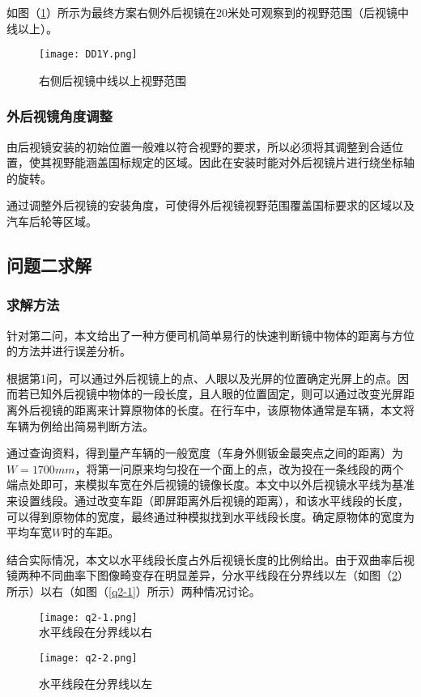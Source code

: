 \documentclass[bwprint]{cumcmthesis}
\begin{document}
\par 如图（\ref{fig:DD1Y}）所示为最终方案右侧外后视镜在20米处可观察到的视野范围（后视镜中线以上）。

\begin{figure}[!htbp]
\small
\centering
\texttt{[image: DD1Y.png]}
\caption{右侧后视镜中线以上视野范围} \label{fig:DD1Y}
\end{figure}

 
\subsubsection{外后视镜角度调整}
\par 由后视镜安装的初始位置一般难以符合视野的要求，所以必须将其调整到合适位置，使其视野能涵盖国标规定的区域。因此在安装时能对外后视镜片进行绕坐标轴的旋转。

\par 通过调整外后视镜的安装角度，可使得外后视镜视野范围覆盖国标要求的区域以及汽车后轮等区域。
 
\subsection{问题二求解}
\subsubsection{求解方法}
\par 针对第二问，本文给出了一种方便司机简单易行的快速判断镜中物体的距离与方位的方法并进行误差分析。
\par 根据第1问，可以通过外后视镜上的点、人眼以及光屏的位置确定光屏上的点。因而若已知外后视镜中物体的一段长度，且人眼的位置固定，则可以通过改变光屏距离外后视镜的距离来计算原物体的长度。在行车中，该原物体通常是车辆，本文将车辆为例给出简易判断方法。
\par 通过查询资料，得到量产车辆的一般宽度（车身外侧钣金最突点之间的距离）为$W=1700mm$，将第一问原来均匀投在一个面上的点，改为投在一条线段的两个端点处即可，来模拟车宽在外后视镜的镜像长度。本文中以外后视镜水平线为基准来设置线段。通过改变车距（即屏距离外后视镜的距离），和该水平线段的长度，可以得到原物体的宽度，最终通过种模拟找到水平线段长度。确定原物体的宽度为平均车宽$W$时的车距。
\par 结合实际情况，本文以水平线段长度占外后视镜长度的比例给出。由于双曲率后视镜两种不同曲率下图像畸变存在明显差异，分水平线段在分界线以左（如图（\ref{q2-2}）所示）以右（如图（\ref{q2-1}）所示）两种情况讨论。

\begin{figure}[!htbp]  
\begin{minipage}[t]{0.5\textwidth}
\centering  
\texttt{[image: q2-1.png]} \\
\caption{水平线段在分界线以右} \label{q2-1}
\end{minipage}
\hspace{1ex}
\begin{minipage}[t]{0.5\textwidth}  
\centering  
\texttt{[image: q2-2.png]}\\
\caption{水平线段在分界线以左}  \label{q2-2}
\end{minipage}  
\end{figure} 
\end{document}
